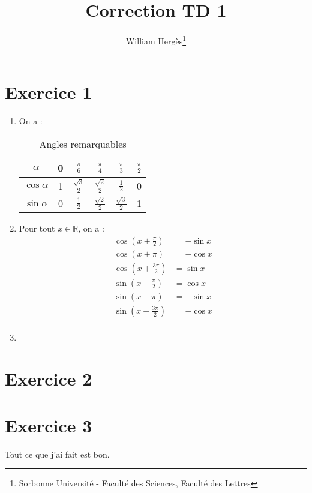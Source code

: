 \documentclass[a4paper, titlepage]{article}
\title{Correction TD 1}
\author{William Hergès\thanks{Sorbonne Université - Faculté des Sciences, Faculté des Lettres}}
\begin{document}
	\maketitle
	\section*{Exercice 1}
	\begin{enumerate}
		\item On a : 
			\begin{table}[htpb]
				\centering
				\caption{Angles remarquables}
				\label{tab:trigo}
				\begin{tabular}{|c|c|c|c|c|c|}
					\hline
					$\alpha$ & 0 & $\frac{\pi}{6}$ & $\frac{\pi}{4}$ & $\frac{\pi}{3}$ & $\frac{\pi}{2}$\\
				\hline
					$\cos\alpha$ & 1 & $\frac{\sqrt 3}{2}$ & $\frac{\sqrt 2}{2}$ & $\frac{1}{2}$ & 0 \\
					\hline
					$\sin\alpha$ & 0 & $\frac{1}{2}$ & $\frac{\sqrt 2}{2}$ & $\frac{\sqrt 3}{2}$ & 1 \\
					\hline
				\end{tabular}
			\end{table}
		\item Pour tout $x\in\mathbb{R}$, on a :
			\begin{align*}
				\cos\left( x+\frac{\pi}{2} \right) &= -\sin x \\
				\cos\left( x+\pi \right) &= -\cos x \\
				\cos\left( x+\frac{3\pi}{2} \right) &= \sin x \\
				\sin\left( x+\frac{\pi}{2} \right) &= \cos x \\
				\sin\left( x+\pi \right) &= -\sin x \\
				\sin\left( x+\frac{3\pi}{2} \right) &= -\cos x \\
			\end{align*}
		\item \AQT
	\end{enumerate}
	\section*{Exercice 2}
	\AQT
	\section*{Exercice 3}
	Tout ce que j'ai fait est bon.
\end{document}
